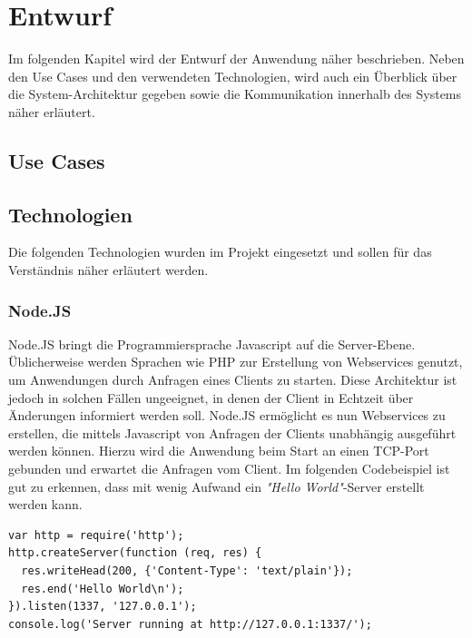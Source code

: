 \section{Entwurf}
\label{sec:Entwurf}
Im folgenden Kapitel wird der Entwurf der Anwendung näher beschrieben. Neben den Use Cases und den verwendeten Technologien, wird auch ein Überblick über die System-Architektur gegeben sowie die Kommunikation innerhalb des Systems näher erläutert.

\subsection{Use Cases}
\label{subsec:UseCases}
\subsection{Technologien}
\label{subsec:Technologien}
Die folgenden Technologien wurden im Projekt eingesetzt und sollen für das Verständnis näher erläutert werden.

\subsubsection{Node.JS}
\label{subsec:NodeJS}
Node.JS \cite{nodejswebsite} bringt die Programmiersprache Javascript auf die Server-Ebene. Üblicherweise werden Sprachen wie PHP zur Erstellung von Webservices genutzt, um Anwendungen durch Anfragen eines Clients zu starten. Diese Architektur ist jedoch in solchen Fällen ungeeignet, in denen der Client in Echtzeit über Änderungen informiert werden soll. Node.JS ermöglicht es nun Webservices zu erstellen, die mittels Javascript von Anfragen der Clients unabhängig ausgeführt werden können. Hierzu wird die Anwendung beim Start an einen TCP-Port gebunden und erwartet die Anfragen vom Client. Im folgenden Codebeispiel ist gut zu erkennen, dass mit wenig Aufwand ein \textit{"Hello World"}-Server erstellt werden kann.

\begin{lstlisting}
var http = require('http');
http.createServer(function (req, res) {
  res.writeHead(200, {'Content-Type': 'text/plain'});
  res.end('Hello World\n');
}).listen(1337, '127.0.0.1');
console.log('Server running at http://127.0.0.1:1337/');
\end{lstlisting}

